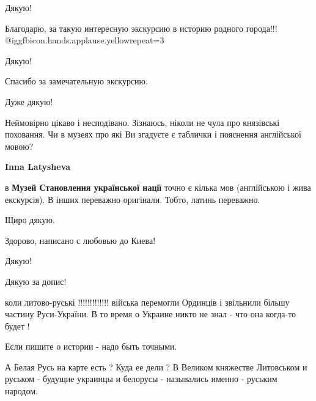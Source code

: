  
 
 
 
 
\zzSecCmt

\begin{itemize} %
Дякую!

Благодарю, за такую интересную экскурсию в историю родного города!!! @igg{fbicon.hands.applause.yellow}{repeat=3} 

Дякую!

Спасибо за замечательную экскурсию.

Дуже дякую!


Неймовірно цікаво і несподівано. Зізнаюсь, ніколи не чула про князівські
поховання. Чи в музеях про які Ви згадуєте є таблички і пояснення англійської
мовою?

\textbf{Inna Latysheva} 

в \textbf{Музей Становлення української нації} точно є кілька мов (англійською і жива екскурсія).
В інших переважно оригінали. Тобто, латинь переважно.

Щиро дякую.

Здорово, написано с любовью до Киева!

Дякую!

Дякую за допис!


коли литово-руські !!!!!!!!!!!!! війська перемогли Ординців і звільнили більшу
частину Руси-України. В то время о Украине никто не знал - что она когда-то
будет !


Если пишите о истории - надо быть точными.


А Белая Русь на карте есть ? Куда ее дели ? В Великом княжестве Литовськом и
руськом - будущие украинцы и белорусы - назывались именно - руським народом.

\begin{itemize} %


\end{itemize}
\end{itemize}

